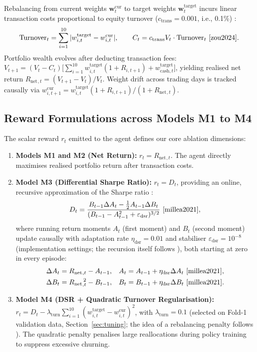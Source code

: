 \documentclass[11pt,a4paper]{article}
\numberwithin{equation}{section}
\numberwithin{table}{section}
\numberwithin{figure}{section}
\numberwithin{algorithm}{section}
\newcommand{\bw}{\mathbf{w}}
\newcommand{\Rnet}{R_{\mathrm{net}}}
\begin{document}
Rebalancing from current weights $\bw_t^{\mathrm{cur}}$ to target weights $\bw_t^{\mathrm{target}}$ incurs linear transaction costs proportional to equity turnover ($c_{\mathrm{trans}}=0.001$, i.e., 0.1\%) \cite{zou2024}:
\begin{equation}
\mathrm{Turnover}_t=\sum_{i=1}^{10}|w_{i,t}^{\mathrm{target}}-w_{i,t}^{\mathrm{cur}}|,\qquad C_t=c_{\mathrm{trans}}V_t\cdot\mathrm{Turnover}_t\ \cite{zou2024}.
\end{equation}
Portfolio wealth evolves after deducting transaction fees: $V_{t+1}=(V_t-C_t)\bigl[\sum_{i=1}^{10}w_{i,t}^{\mathrm{target}}(1+R_{i,t+1})+w_{\mathrm{cash},t}^{\mathrm{target}}\bigr]$, yielding realised net return $\Rnet{}_{,t}=(V_{t+1}-V_t)/V_t$. Weight drift across trading days is tracked causally via $w_{i,t+1}^{\mathrm{cur}}=w_{i,t}^{\mathrm{target}}(1+R_{i,t+1})/(1+\Rnet{}_{,t})$.

\subsection{Reward Formulations across Models M1 to M4}\label{sec:reward}
The scalar reward $r_t$ emitted to the agent defines our core ablation dimensions:
\begin{enumerate}
\item \textbf{Models M1 and M2 (Net Return):} $r_t=\Rnet{}_{,t}$. The agent directly maximises realised portfolio return after transaction costs.
\item \textbf{Model M3 (Differential Sharpe Ratio):} $r_t=D_t$, providing an online, recursive approximation of the Sharpe ratio \cite{millea2021}:
\begin{equation}
D_t=\frac{B_{t-1}\Delta A_t-\tfrac12A_{t-1}\Delta B_t}{(B_{t-1}-A_{t-1}^2+\varepsilon_{\mathrm{dsr}})^{3/2}}\ \cite{millea2021},\label{eq:dsr}
\end{equation}
where running return moments $A_t$ (first moment) and $B_t$ (second moment) update causally with adaptation rate $\eta_{\mathrm{dsr}}=0.01$ and stabiliser $\varepsilon_{\mathrm{dsr}}=10^{-8}$ (implementation settings; the recursion itself follows \cite{millea2021}), both starting at zero in every episode:
\begin{align}
\Delta A_t&=\Rnet{}_{,t}-A_{t-1}, & A_t&=A_{t-1}+\eta_{\mathrm{dsr}}\Delta A_t\ \cite{millea2021},\\
\Delta B_t&=\Rnet{}_{,t}^{\,2}-B_{t-1}, & B_t&=B_{t-1}+\eta_{\mathrm{dsr}}\Delta B_t\ \cite{millea2021}.
\end{align}
\item \textbf{Model M4 (DSR + Quadratic Turnover Regularisation):} $r_t=D_t-\lambda_{\mathrm{turn}}\sum_{i=1}^{10}(w_{i,t}^{\mathrm{target}}-w_{i,t}^{\mathrm{cur}})^2$, with $\lambda_{\mathrm{turn}}=0.1$ (selected on Fold-1 validation data, Section~\ref{sec:tuning}; the idea of a rebalancing penalty follows \cite{wang2025}). The quadratic penalty penalises large reallocations during policy training to suppress excessive churning.
\end{enumerate}
\end{document}

